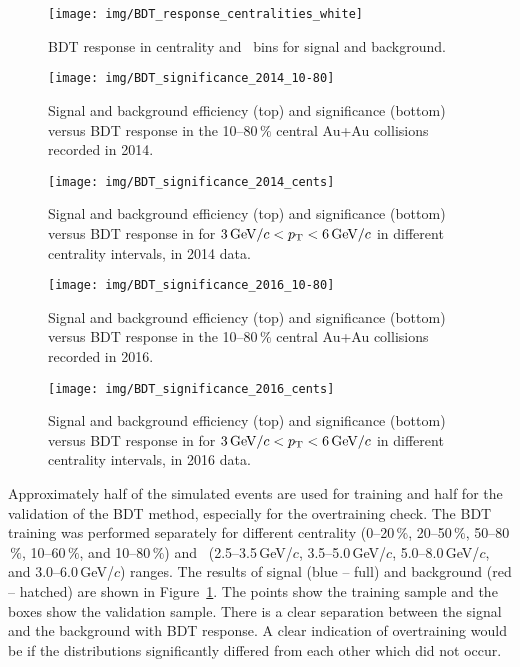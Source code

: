 \begin{figure}[!htb]
\centering
\texttt{[image: img/BDT\_response\_centralities\_white]}
\caption{\label{BDT_centralities}BDT response in centrality and \pt\ bins for signal and background.}
\end{figure}


\begin{figure}[!p]
\vspace{-0.7cm}
\centering
\texttt{[image: img/BDT\_significance\_2014\_10-80]}
\vspace{-1cm}
\caption{\label{BDT_sig_2014_pt}Signal and background efficiency (top) and significance (bottom) versus BDT response in the 10--80$\,\%$ central Au+Au collisions recorded in 2014.}
\end{figure}

\begin{figure}[!p]

\centering
\texttt{[image: img/BDT\_significance\_2014\_cents]}
\vspace{-1cm}
\caption{\label{BDT_sig_2014_cent}Signal and background efficiency (top) and significance (bottom) versus BDT response in for $3\,\text{GeV}/c < {p_{\mathrm{T}}} < 6\,\text{GeV}/c$ in different centrality intervals, in 2014 data.}
\end{figure}

\begin{figure}[!p]
\vspace{-0.7cm}
\centering
\texttt{[image: img/BDT\_significance\_2016\_10-80]}
\vspace{-1cm}
\caption{\label{BDT_sig_2016_pt}Signal and background efficiency (top) and significance (bottom) versus BDT response in the 10--80$\,\%$ central Au+Au collisions recorded in 2016.}
\end{figure}

\begin{figure}[!p]

\centering
\texttt{[image: img/BDT\_significance\_2016\_cents]}
\vspace{-1cm}
\caption{\label{BDT_sig_2016_cent}Signal and background efficiency (top) and significance (bottom) versus BDT response in for $3\,\text{GeV}/c < {p_{\mathrm{T}}} < 6\,\text{GeV}/c$ in different centrality intervals, in 2016 data.}
\end{figure}

Approximately half of the simulated events are used for training and half for the validation of the BDT method, especially for the overtraining check. The BDT training was performed separately for different centrality (0--20$\,\%$, 20--50$\,\%$, 50--80$\,\%$, 10--60$\,\%$, and 10--80$\,\%$) and \pt\ (2.5--3.5$\,$GeV/$c$, 3.5--5.0$\,$GeV/$c$, 5.0--8.0$\,$GeV/$c$,
and 3.0--6.0$\,$GeV/$c$) ranges. The results of signal (blue -- full) and background (red -- hatched) are shown in Figure~\ref{BDT_centralities}\@. The points show the training sample and the boxes show the validation sample. There is a clear separation between the signal and the background with BDT response. A clear indication of overtraining would be if the distributions significantly differed from each other which did not occur.

